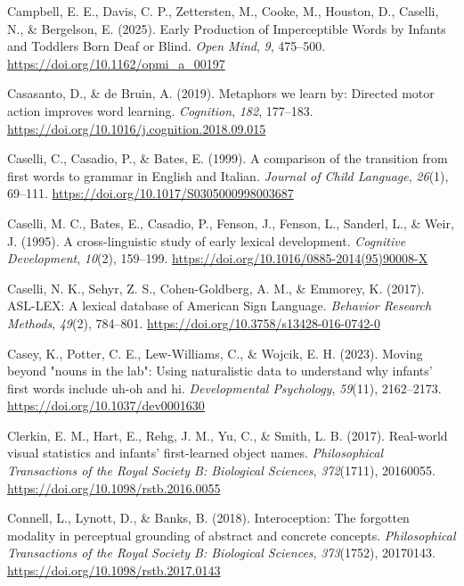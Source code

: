 \documentclass[
  man,floatsintext]{apa6}
\newlength{\cslhangindent}
\newenvironment{CSLReferences}[2] %
 {\begin{list}{}{%
  \setlength{\itemindent}{0pt}
  \setlength{\leftmargin}{0pt}
  \setlength{\parsep}{0pt}
  \ifodd #1
   \setlength{\leftmargin}{\cslhangindent}
   \setlength{\itemindent}{-1\cslhangindent}
  \fi
  \setlength{\itemsep}{#2\baselineskip}}}
 {\end{list}}
\begin{document}
\begin{CSLReferences}{1}{0}
Campbell, E. E., Davis, C. P., Zettersten, M., Cooke, M., Houston, D., Caselli, N., \& Bergelson, E. (2025). Early {Production} of {Imperceptible Words} by {Infants} and {Toddlers Born Deaf} or {Blind}. \emph{Open Mind}, \emph{9}, 475--500. \url{https://doi.org/10.1162/opmi_a_00197}

Casasanto, D., \& de Bruin, A. (2019). Metaphors we learn by: {Directed} motor action improves word learning. \emph{Cognition}, \emph{182}, 177--183. \url{https://doi.org/10.1016/j.cognition.2018.09.015}

Caselli, C., Casadio, P., \& Bates, E. (1999). A comparison of the transition from first words to grammar in {English} and {Italian}. \emph{Journal of Child Language}, \emph{26}(1), 69--111. \url{https://doi.org/10.1017/S0305000998003687}

Caselli, M. C., Bates, E., Casadio, P., Fenson, J., Fenson, L., Sanderl, L., \& Weir, J. (1995). A cross-linguistic study of early lexical development. \emph{Cognitive Development}, \emph{10}(2), 159--199. \url{https://doi.org/10.1016/0885-2014(95)90008-X}

Caselli, N. K., Sehyr, Z. S., Cohen-Goldberg, A. M., \& Emmorey, K. (2017). {ASL-LEX}: {A} lexical database of {American Sign Language}. \emph{Behavior Research Methods}, \emph{49}(2), 784--801. \url{https://doi.org/10.3758/s13428-016-0742-0}

Casey, K., Potter, C. E., Lew-Williams, C., \& Wojcik, E. H. (2023). Moving beyond "nouns in the lab": {Using} naturalistic data to understand why infants' first words include uh-oh and hi. \emph{Developmental Psychology}, \emph{59}(11), 2162--2173. \url{https://doi.org/10.1037/dev0001630}

Clerkin, E. M., Hart, E., Rehg, J. M., Yu, C., \& Smith, L. B. (2017). Real-world visual statistics and infants' first-learned object names. \emph{Philosophical Transactions of the Royal Society B: Biological Sciences}, \emph{372}(1711), 20160055. \url{https://doi.org/10.1098/rstb.2016.0055}

Connell, L., Lynott, D., \& Banks, B. (2018). Interoception: The forgotten modality in perceptual grounding of abstract and concrete concepts. \emph{Philosophical Transactions of the Royal Society B: Biological Sciences}, \emph{373}(1752), 20170143. \url{https://doi.org/10.1098/rstb.2017.0143}


\end{CSLReferences}
\end{document}
